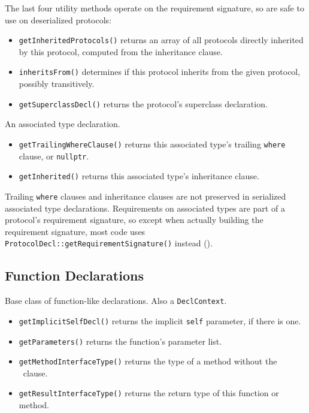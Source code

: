 \documentclass[../generics]{subfiles}
\begin{document}
The last four utility methods operate on the requirement signature, so are safe to use on deserialized protocols:
\begin{itemize}
\item \texttt{getInheritedProtocols()} returns an array of all protocols directly inherited by this protocol, computed from the inheritance clause.
\item \texttt{inheritsFrom()} determines if this protocol inherits from the given protocol, possibly transitively.
\item \texttt{getSuperclassDecl()} returns the protocol's superclass declaration.
\end{itemize}

An associated type declaration.
\begin{itemize}
\item \texttt{getTrailingWhereClause()} returns this associated type's trailing \texttt{where} clause, or \texttt{nullptr}.
\item \texttt{getInherited()} returns this associated type's inheritance clause.
\end{itemize}

Trailing \texttt{where} clauses and inheritance clauses are not preserved in serialized associated type declarations. Requirements on associated types are part of a protocol's requirement signature, so except when actually building the requirement signature, most code uses \texttt{ProtocolDecl::getRequirementSignature()} instead ().

\subsection*{Function Declarations}

Base class of function-like declarations. Also a \texttt{DeclContext}.
\begin{itemize}
\item \texttt{getImplicitSelfDecl()} returns the implicit \texttt{self} parameter, if there is one.
\item \texttt{getParameters()} returns the function's parameter list.
\item \texttt{getMethodInterfaceType()} returns the type of a method without the \tSelf\ clause.
\item \texttt{getResultInterfaceType()} returns the return type of this function or method.
\end{itemize}
\end{document}

